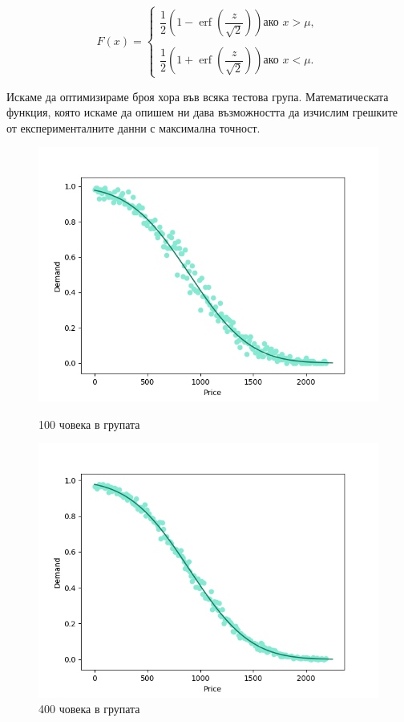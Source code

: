 \documentclass[11pt, a4paper]{article}
\theoremstyle{definition}
\begin{document}
				$$
				F(x)=
				\begin{cases}
					\dfrac{1}{2}\left (1-\operatorname{erf}\left (\dfrac{z}{\sqrt{2}}\right )\right ) 	\text{ако } x>\mu,\\
					\\
					\dfrac{1}{2}\left (1+\operatorname{erf}\left (\dfrac{z}{\sqrt{2}}\right )\right ) \text{ако } x<\mu.
				\end{cases}
				$$\par
				Искаме да оптимизираме броя хора във всяка тестова група. Математическата функция, която искаме да опишем ни дава възможността да изчислим грешките от експерименталните данни с максимална точност.
				\begin{figure}[H]
					\begin{minipage}{0.48\textwidth}
						\centering
						\includegraphics[width=\linewidth]{Exp_and_math_100}
						\caption{100 човека в групата}\label{Fig:Data3}
					\end{minipage}\hfill
					\begin{minipage}{0.48\textwidth}
						\centering
						\includegraphics[width=\linewidth]{Exp_and_math_400}
						\caption{400 човека в групата}\label{Fig:Data4}
					\end{minipage}
				\end{figure}\par\noindent
\end{document}
